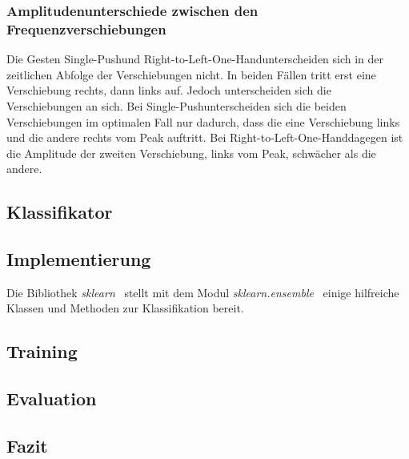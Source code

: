 \subsubsection*{Amplitudenunterschiede zwischen den Frequenzverschiebungen}
Die Gesten \glqq Single-Push\glqq und \glqq Right-to-Left-One-Hand\glqq unterscheiden sich in der zeitlichen Abfolge der Verschiebungen nicht. In beiden Fällen tritt erst eine Verschiebung rechts, dann links auf. Jedoch unterscheiden sich die Verschiebungen an sich. Bei \glqq Single-Push\glqq unterscheiden sich die beiden Verschiebungen im optimalen Fall nur dadurch, dass die eine Verschiebung links und die andere rechts vom Peak auftritt. Bei \glqq Right-to-Left-One-Hand\glqq dagegen ist die Amplitude der zweiten Verschiebung, links vom Peak, schwächer als die andere.

\subsection{Klassifikator}

\subsection{Implementierung}

Die Bibliothek \textit{sklearn}~\cite{sklearn} stellt mit dem Modul \textit{sklearn.ensemble}~\cite{sklearn.ensemble} einige hilfreiche Klassen und Methoden zur Klassifikation bereit.

\subsection{Training}

\subsection{Evaluation}

\subsection{Fazit}



